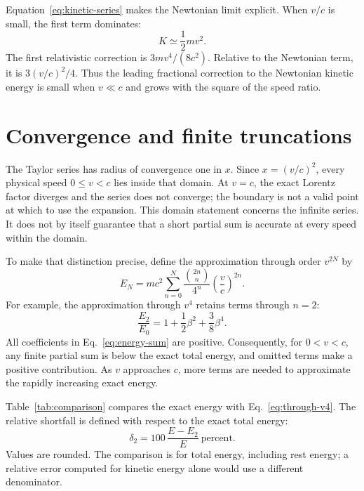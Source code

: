 \documentclass[12pt]{article}
\begin{document}
Equation~\eqref{eq:kinetic-series} makes the Newtonian limit explicit. When $v/c$ is small, the first term dominates:
\begin{equation}
  K\simeq\frac{1}{2}mv^2.
  \label{eq:low-speed-kinetic-energy}
\end{equation}
The first relativistic correction is $3mv^4/(8c^2)$. Relative to the Newtonian term, it is $3(v/c)^2/4$. Thus the leading fractional correction to the Newtonian kinetic energy is small when $v\ll c$ and grows with the square of the speed ratio.

\section{Convergence and finite truncations}

The Taylor series has radius of convergence one in $x$. Since $x=(v/c)^2$, every physical speed $0\leq v<c$ lies inside that domain. At $v=c$, the exact Lorentz factor diverges and the series does not converge; the boundary is not a valid point at which to use the expansion. This domain statement concerns the infinite series. It does not by itself guarantee that a short partial sum is accurate at every speed within the domain.

To make that distinction precise, define the approximation through order $v^{2N}$ by
\begin{equation}
  E_N=mc^2\sum_{n=0}^{N}
       \frac{\binom{2n}{n}}{4^n}\left(\frac{v}{c}\right)^{2n}.
  \label{eq:truncation}
\end{equation}
For example, the approximation through $v^4$ retains terms through $n=2$:
\begin{equation}
  \frac{E_2}{E_0}=1+\frac{1}{2}\beta^2+\frac{3}{8}\beta^4.
  \label{eq:through-v4}
\end{equation}
All coefficients in Eq.~\eqref{eq:energy-sum} are positive. Consequently, for $0<v<c$, any finite partial sum is below the exact total energy, and omitted terms make a positive contribution. As $v$ approaches $c$, more terms are needed to approximate the rapidly increasing exact energy.

Table~\ref{tab:comparison} compares the exact energy with Eq.~\eqref{eq:through-v4}. The relative shortfall is defined with respect to the exact total energy:
\begin{equation}
  \delta_2=100\,\frac{E-E_2}{E}\ \text{percent}.
  \label{eq:relative-shortfall}
\end{equation}
Values are rounded. The comparison is for total energy, including rest energy; a relative error computed for kinetic energy alone would use a different denominator.
\end{document}
